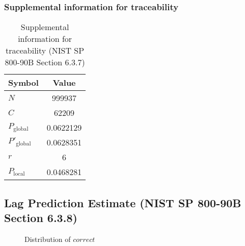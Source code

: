 \documentclass[a3paper,xelatex,english]{bxjsarticle}
\begin{document}
\subsubsection{Supplemental information for traceability}
\renewcommand{\arraystretch}{1.8}
\begin{table}[h]
\caption{Supplemental information for traceability (NIST SP 800-90B Section 6.3.7)}
\begin{center}
\begin{tabular}{|l|c|}
\hline 
\rowcolor{anotherlightblue} %
Symbol				& Value \\ \hline 
$N$				& 999937\\ \hline 
$C$				& 62209\\ \hline 
$P_{\textrm{global}}$				& 0.0622129\\ \hline 
$P'_{\textrm{global}}$			& 0.0628351\\ \hline 
$r$				& 6\\ \hline 
$P_{\textrm{local}}$ 			& 0.0468281\\ \hline
\end{tabular}
\end{center}
\end{table}
\renewcommand{\arraystretch}{1.4}
\clearpage
\subsection{Lag Prediction Estimate (NIST SP 800-90B Section 6.3.8)}\label{sec:NonBinary638}

\begin{figure}[htbp]
\centering

\caption{Distribution of $correct$}
\end{figure}
\end{document}
